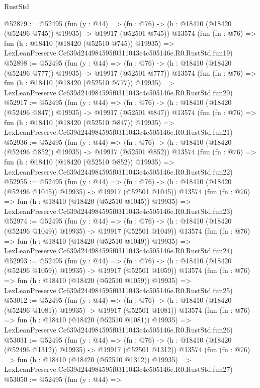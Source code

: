 \begin{lexlean}{RustStd}
\begin{coremodule}
@52879 := @52495
    (fun (y : @44) =>
    (fn : @76) -> (h : @18410 (@18420 (@52496 @745)) @19935) -> @19917 (@52501 @745))
    @13574
    (fun (fn : @76) =>
    fun (h : @18410 (@18420 (@52510 @745)) @19935) =>
    LexLeanPreserve.Cc639d244984595f0311043c4c505146e.R0.RustStd.fun19)
@52898 := @52495
    (fun (y : @44) =>
    (fn : @76) -> (h : @18410 (@18420 (@52496 @777)) @19935) -> @19917 (@52501 @777))
    @13574
    (fun (fn : @76) =>
    fun (h : @18410 (@18420 (@52510 @777)) @19935) =>
    LexLeanPreserve.Cc639d244984595f0311043c4c505146e.R0.RustStd.fun20)
@52917 := @52495
    (fun (y : @44) =>
    (fn : @76) -> (h : @18410 (@18420 (@52496 @847)) @19935) -> @19917 (@52501 @847))
    @13574
    (fun (fn : @76) =>
    fun (h : @18410 (@18420 (@52510 @847)) @19935) =>
    LexLeanPreserve.Cc639d244984595f0311043c4c505146e.R0.RustStd.fun21)
@52936 := @52495
    (fun (y : @44) =>
    (fn : @76) -> (h : @18410 (@18420 (@52496 @852)) @19935) -> @19917 (@52501 @852))
    @13574
    (fun (fn : @76) =>
    fun (h : @18410 (@18420 (@52510 @852)) @19935) =>
    LexLeanPreserve.Cc639d244984595f0311043c4c505146e.R0.RustStd.fun22)
@52955 := @52495
    (fun (y : @44) =>
    (fn : @76) -> (h : @18410 (@18420 (@52496 @1045)) @19935) -> @19917 (@52501 @1045))
    @13574
    (fun (fn : @76) =>
    fun (h : @18410 (@18420 (@52510 @1045)) @19935) =>
    LexLeanPreserve.Cc639d244984595f0311043c4c505146e.R0.RustStd.fun23)
@52974 := @52495
    (fun (y : @44) =>
    (fn : @76) -> (h : @18410 (@18420 (@52496 @1049)) @19935) -> @19917 (@52501 @1049))
    @13574
    (fun (fn : @76) =>
    fun (h : @18410 (@18420 (@52510 @1049)) @19935) =>
    LexLeanPreserve.Cc639d244984595f0311043c4c505146e.R0.RustStd.fun24)
@52993 := @52495
    (fun (y : @44) =>
    (fn : @76) -> (h : @18410 (@18420 (@52496 @1059)) @19935) -> @19917 (@52501 @1059))
    @13574
    (fun (fn : @76) =>
    fun (h : @18410 (@18420 (@52510 @1059)) @19935) =>
    LexLeanPreserve.Cc639d244984595f0311043c4c505146e.R0.RustStd.fun25)
@53012 := @52495
    (fun (y : @44) =>
    (fn : @76) -> (h : @18410 (@18420 (@52496 @1081)) @19935) -> @19917 (@52501 @1081))
    @13574
    (fun (fn : @76) =>
    fun (h : @18410 (@18420 (@52510 @1081)) @19935) =>
    LexLeanPreserve.Cc639d244984595f0311043c4c505146e.R0.RustStd.fun26)
@53031 := @52495
    (fun (y : @44) =>
    (fn : @76) -> (h : @18410 (@18420 (@52496 @1312)) @19935) -> @19917 (@52501 @1312))
    @13574
    (fun (fn : @76) =>
    fun (h : @18410 (@18420 (@52510 @1312)) @19935) =>
    LexLeanPreserve.Cc639d244984595f0311043c4c505146e.R0.RustStd.fun27)
@53050 := @52495
    (fun (y : @44) =>

\end{coremodule}
\end{lexlean}
